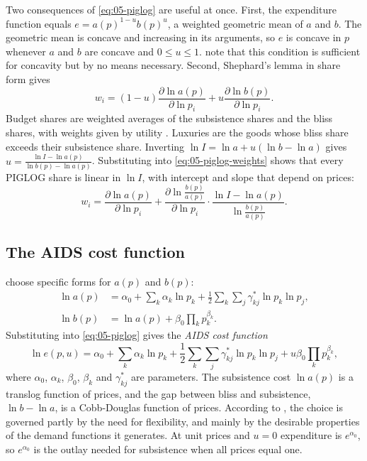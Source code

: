 Two consequences of \eqref{eq:05-piglog} are useful at once. First, the expenditure function equals
$e = a(p)^{1-u}b(p)^u$, a weighted geometric mean of $a$ and $b$. The geometric mean is concave and
increasing in its arguments, so $e$ is concave in $p$ whenever $a$ and $b$ are concave and $0 \leq u \leq 1$.
\citet[p.~324]{DeatonMuellbauer1980a} note that this condition is sufficient for concavity but by no
means necessary. Second, Shephard's lemma in share form gives
\begin{equation}\label{eq:05-piglog-weights}
w_i = (1 - u)\frac{\partial\ln a(p)}{\partial\ln p_i} + u\frac{\partial\ln b(p)}{\partial\ln p_i} .
\end{equation}
Budget shares are weighted averages of the subsistence shares and the bliss shares, with weights given by
utility \citep[p.~324]{DeatonMuellbauer1980a}. Luxuries are the goods whose bliss share exceeds their
subsistence share. Inverting $\ln I = \ln a + u(\ln b - \ln a)$ gives
$u = \frac{\ln I - \ln a(p)}{\ln b(p) - \ln a(p)}$. Substituting into \eqref{eq:05-piglog-weights} shows that
every PIGLOG share is linear in $\ln I$, with intercept and slope that depend on prices:
\begin{equation}\label{eq:05-piglog-share}
w_i = \frac{\partial\ln a(p)}{\partial\ln p_i} + \frac{\partial\ln\frac{b(p)}{a(p)}}{\partial\ln p_i}\cdot
\frac{\ln I - \ln a(p)}{\ln\frac{b(p)}{a(p)}} .
\end{equation}

\subsection{The AIDS cost function}\label{sec:05-aids-cost}

\citet[p.~313]{DeatonMuellbauer1980a} choose specific forms for $a(p)$ and $b(p)$:
\begin{align}
\ln a(p) &= \alpha_0 + \sum_k\alpha_k\ln p_k + \frac{1}{2}\sum_k\sum_j\gamma^*_{kj}\ln p_k\ln p_j,
  \label{eq:05-aids-a}\\
\ln b(p) &= \ln a(p) + \beta_0\prod_k p_k^{\beta_k}. \label{eq:05-aids-b}
\end{align}
Substituting into \eqref{eq:05-piglog} gives the \emph{AIDS cost function}
\begin{equation}\label{eq:05-aids-cost}
\ln e(p, u) = \alpha_0 + \sum_k\alpha_k\ln p_k + \frac{1}{2}\sum_k\sum_j\gamma^*_{kj}\ln p_k\ln p_j
+ u\beta_0\prod_k p_k^{\beta_k},
\end{equation}
where $\alpha_0$, $\alpha_k$, $\beta_0$, $\beta_k$ and $\gamma^*_{kj}$ are parameters. The subsistence cost
$\ln a(p)$ is a translog function of prices, and the gap between bliss and subsistence, $\ln b - \ln a$, is a
Cobb-Douglas function of prices. According to \citet[p.~313]{DeatonMuellbauer1980a}, the choice is governed
partly by the need for flexibility, and mainly by the desirable properties of the demand functions it
generates. At unit prices and $u = 0$ expenditure is $e^{\alpha_0}$, so $e^{\alpha_0}$ is the outlay needed for
subsistence when all prices equal one.

